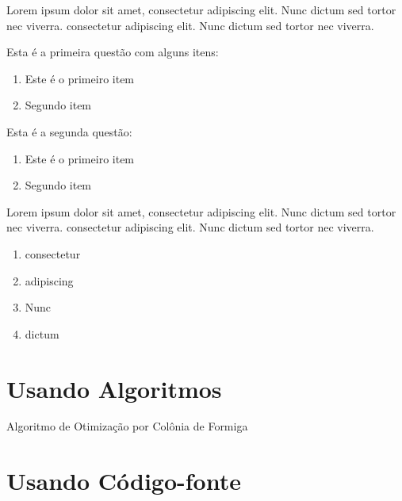 \documentclass{uecetex2}
\begin{document}
Lorem ipsum dolor sit amet, consectetur adipiscing elit. Nunc dictum sed tortor nec viverra. consectetur adipiscing elit. Nunc dictum sed tortor nec viverra.

\begin{questao}
	\item Esta é a primeira questão com alguns itens:
	\begin{enumerate}
		\item Este é o primeiro item
		\item Segundo item
	\end{enumerate}
	\item Esta é a segunda questão:
	\begin{enumerate}
		\item Este é o primeiro item
		\item Segundo item
	\end{enumerate}
	\item Lorem ipsum dolor sit amet, consectetur adipiscing elit. Nunc dictum sed tortor nec viverra. consectetur adipiscing elit. Nunc dictum sed tortor nec viverra.
	\begin{enumerate}
		\item consectetur
		\item adipiscing
		\item Nunc
		\item dictum
	\end{enumerate}
\end{questao}

\section{Usando Algoritmos}

\blindtext

\begin{algorithm}[h!]
	\SetSpacedAlgorithm
	\caption{\label{alg:algoritmo_de_colonica_de_formigas}Algoritmo de Otimização por Colônia de Formiga}
\end{algorithm}

\blindtext

\section{Usando Código-fonte}
\end{document}
